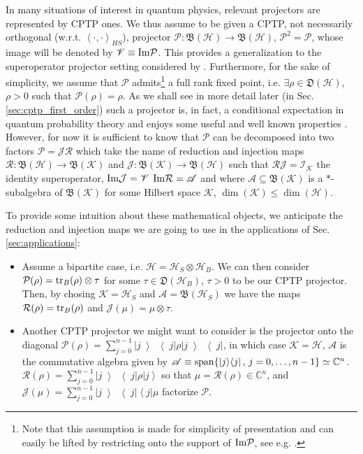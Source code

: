 \documentclass[twocolumn]{autart}    %
\newcommand{\Hc}{\mathcal{H}}
\newcommand{\Ic}{\mathcal{I}}
\newcommand{\Jc}{\mathcal{J}}
\newcommand{\Kc}{\mathcal{K}}
\newcommand{\Pc}{\mathcal{P}}
\newcommand{\Rc}{\mathcal{R}}
\newcommand{\As}{\mathscr{A}}
\newcommand{\Vs}{\mathscr{V}}
\newcommand{\Cb}{\mathbb{C}}
\newcommand{\Bf}{\mathfrak{B}}
\newcommand{\Df}{\mathfrak{D}}
\newcommand{\tr}{{\rm tr}}
\newcommand{\Span}{{\rm span}}
\newcommand{\ket}[1]{\left| #1 \right>}
\newcommand{\bra}[1]{\left< #1 \right|}
\newcommand{\inner}[2]{\left< #1,#2 \right>}
\newcommand{\ketbra}[2]{\left\vert #1 \middle>\middle< #2 \right\vert}
\begin{document}
In many situations of interest in quantum physics, relevant projectors are represented by CPTP ones. We thus assume to be given a CPTP, not necessarily orthogonal (w.r.t. $\inner{\cdot}{\cdot}_{HS}$), projector $\Pc:\Bf(\Hc)\to\Bf(\Hc)$, $\Pc^2=\Pc$, whose image will be denoted by $\Vs \equiv {\rm Im}\Pc$. This provides a generalization to the superoperator projector setting considered by \cite{breuer2006,breuer2007}.  Furthermore, for the sake of simplicity, we assume that $\Pc$ admits\footnote{Note that this assumption is made for simplicity of presentation and can easily be lifted by restricting onto the support of ${\rm Im}\Pc$, see e.g. \cite{wolf2012quantum}.} a full rank fixed point, i.e. $\exists\rho\in\Df(\Hc)$, $\rho>0$ such that $\Pc(\rho)=\rho$. 
As we shall see in more detail later (in Sec.\ref{sec:cptp_first_order}) such a projector is, in fact, a conditional expectation in quantum probability theory \cite{petz2007quantum,blackadar2006operator} and enjoys some useful and well known properties \cite{lindblad1999general,wolf2012quantum,ticozzi2017alternating,bialonczyk2018application,blume2010information,grigoletto2024exact,wolf2010inverseeigenvalueproblemquantum}. However, for now it is sufficient to know that $\Pc$ can be decomposed into two factors $\Pc = \Jc\Rc$ which take the name of reduction and injection maps $\Rc:\Bf(\Hc)\to\Bf(\Kc)$ and $\Jc:\Bf(\Kc)\to\Bf(\Hc)$ such that $\Rc\Jc = \Ic_\Kc$ the identity superoperator, ${\rm Im}\Jc = \Vs$ ${\rm Im}\Rc=\As$ and where $\As\subseteq\Bf(\Kc)$ is a $*$-subalgebra of $\Bf(\Kc)$ for some Hilbert space $\Kc$, $\dim(\Kc)\leq\dim(\Hc)$.

To provide some intuition about these mathematical objects, we anticipate the reduction and injection maps we are going to use in the applications of Sec.\,\ref{sec:applications}:
\begin{itemize}
    \item Assume a bipartite case, i.e. $\Hc=\Hc_S\otimes\Hc_B$. We can then consider $\Pc(\rho) = \tr_B(\rho)\otimes\tau$ for some $\tau\in\Df(\Hc_B)$, $\tau>0$ to be our CPTP projector. Then, by chosing $\Kc=\Hc_S$ and $\As=\Bf(\Hc_S)$ we have the maps $\Rc(\rho) = \tr_B(\rho)$ and $\Jc(\mu) = \mu\otimes\tau$.
    \item Another CPTP projector we might want to consider is the projector onto the diagonal $\Pc(\rho)= \sum_{j=0}^{n-1} \ketbra{j}{j} \rho \ketbra{j}{j}$, in which case $\Kc=\Hc$, $\As$ is the commutative algebra given by $\As\equiv\Span\{\ketbra{j}{j},\, j=0,\dots,n-1\}\simeq\Cb^n$. $\Rc(\rho) = \sum_{j=0}^{n-1} \ketbra{j}{j}\rho \ket{j}$ so that $\mu=\Rc(\rho)\in\Cb^n$, and $\Jc(\mu)=\sum_{j=0}^{n-1} \ketbra{j}{j} \bra{j}\mu$ factorize $\Pc$.
\end{itemize}
\end{document}
